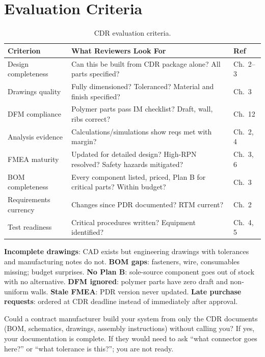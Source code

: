 \documentclass[11pt,letterpaper,twoside,openany]{book}
\begin{document}
\section{Evaluation Criteria}

\begin{table}[htbp]\centering\small
\begin{tabularx}{\textwidth}{l X l}
\toprule
\textbf{Criterion} & \textbf{What Reviewers Look For} & \textbf{Ref} \\
\midrule
Design completeness & Can this be built from CDR package alone? All parts specified? & Ch.~2--3 \\
Drawings quality & Fully dimensioned? Toleranced? Material and finish specified? & Ch.~3 \\
DFM compliance & Polymer parts pass IM checklist? Draft, wall, ribs correct? & Ch.~12 \\
Analysis evidence & Calculations/simulations show reqs met with margin? & Ch.~2, 4 \\
FMEA maturity & Updated for detailed design? High-RPN resolved? Safety hazards mitigated? & Ch.~3, 6 \\
BOM completeness & Every component listed, priced, Plan B for critical parts? Within budget? & Ch.~3 \\
Requirements currency & Changes since PDR documented? RTM current? & Ch.~2 \\
Test readiness & Critical procedures written? Equipment identified? & Ch.~4, 5 \\
\bottomrule
\end{tabularx}
\caption{CDR evaluation criteria.}
\end{table}

\begin{tipbox}
\textbf{Incomplete drawings}: CAD exists but engineering drawings with tolerances and manufacturing notes do not. \textbf{BOM gaps}: fasteners, wire, consumables missing; budget surprises. \textbf{No Plan B}: sole-source component goes out of stock with no alternative. \textbf{DFM ignored}: polymer parts have zero draft and non-uniform walls. \textbf{Stale FMEA}: PDR version never updated. \textbf{Late purchase requests}: ordered at CDR deadline instead of immediately after approval.
\end{tipbox}

\begin{tipbox}
Could a contract manufacturer build your system from only the CDR documents (BOM, schematics, drawings, assembly instructions) without calling you? If yes, your documentation is complete. If they would need to ask ``what connector goes here?'' or ``what tolerance is this?''; you are not ready.
\end{tipbox}
\end{document}
